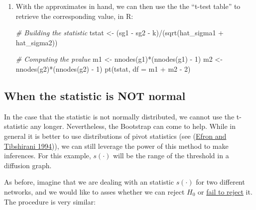 \documentclass[
]{book}
\newenvironment{Shaded}{\begin{snugshade}}{\end{snugshade}}
\newcommand{\AttributeTok}[1]{\textcolor[rgb]{0.77,0.63,0.00}{#1}}
\newcommand{\CommentTok}[1]{\textcolor[rgb]{0.56,0.35,0.01}{\textit{#1}}}
\newcommand{\DecValTok}[1]{\textcolor[rgb]{0.00,0.00,0.81}{#1}}
\newcommand{\FunctionTok}[1]{\textcolor[rgb]{0.00,0.00,0.00}{#1}}
\newcommand{\NormalTok}[1]{#1}
\newcommand{\OtherTok}[1]{\textcolor[rgb]{0.56,0.35,0.01}{#1}}
\newcommand{\SpecialCharTok}[1]{\textcolor[rgb]{0.00,0.00,0.00}{#1}}
\begin{document}
\begin{enumerate}
\begin{Shaded}
\end{Shaded}
\item
  With the approximates in hand, we can then use the the ``t-test table'' to
  retrieve the corresponding value, in R:

\begin{Shaded}
\begin{Highlighting}[]
\CommentTok{\# Building the statistic}
\NormalTok{tstat }\OtherTok{\textless{}{-}}\NormalTok{ (sg1 }\SpecialCharTok{{-}}\NormalTok{ sg2 }\SpecialCharTok{{-}}\NormalTok{ k)}\SpecialCharTok{/}\NormalTok{(}\FunctionTok{sqrt}\NormalTok{(hat\_sigma1 }\SpecialCharTok{+}\NormalTok{ hat\_sigma2))}

\CommentTok{\# Computing the pvalue}
\NormalTok{m1 }\OtherTok{\textless{}{-}} \FunctionTok{nnodes}\NormalTok{(g1)}\SpecialCharTok{*}\NormalTok{(}\FunctionTok{nnodes}\NormalTok{(g1) }\SpecialCharTok{{-}} \DecValTok{1}\NormalTok{)}
\NormalTok{m2 }\OtherTok{\textless{}{-}} \FunctionTok{nnodes}\NormalTok{(g2)}\SpecialCharTok{*}\NormalTok{(}\FunctionTok{nnodes}\NormalTok{(g2) }\SpecialCharTok{{-}} \DecValTok{1}\NormalTok{)}
\FunctionTok{pt}\NormalTok{(tstat, }\AttributeTok{df =}\NormalTok{ m1 }\SpecialCharTok{+}\NormalTok{ m2 }\SpecialCharTok{{-}} \DecValTok{2}\NormalTok{)}
\end{Highlighting}
\end{Shaded}
\end{enumerate}

\hypertarget{when-the-statistic-is-not-normal}{%
\subsection{When the statistic is NOT normal}\label{when-the-statistic-is-not-normal}}

In the case that the statistic is not normally distributed, we cannot use the
t-statistic any longer. Nevertheless, the Bootstrap can come to help. While
in general it is better to use distributions of pivot statistics (see (\protect\hyperlink{ref-Efron1994}{Efron and Tibshirani 1994})),
we can still leverage the power of this method to make inferences. For this
example, \(s(\cdot)\) will be the range of the threshold in a diffusion graph.

As before, imagine that we are dealing with an statistic \(s(\cdot)\) for two
different networks, and we would like to asses whether we can reject \(H_0\)
or \href{https://www.thoughtco.com/fail-to-reject-in-a-hypothesis-test-3126424}{fail to reject} it.
The procedure is very similar:
\end{document}
